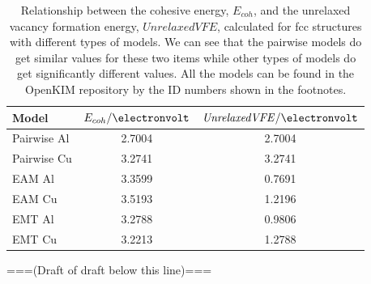 \documentclass[%
 reprint,
 amsmath,amssymb,
 aps,
]{revtex4-1}
\begin{document}
\begin{table}[!b]
\caption{\label{tab:cohvfe}
 Relationship between the cohesive energy, $E_{coh}$, and the unrelaxed vacancy formation energy, $\mathit{UnrelaxedVFE}$, calculated for fcc structures with different types of models.
 We can see that the pairwise models do get similar values for these two items while other types of models do get significantly different values.
 All the models can be found in the OpenKIM repository by the ID numbers shown in the footnotes.
}
\begin{ruledtabular}
\begin{tabular}{l c c}
 Model & $E_{coh}/\electronvolt$ & $\mathit{UnrelaxedVFE}/\electronvolt$\\
\hline
Pairwise Al\footnotemark[1] & 2.7004 & 2.7004\\
Pairwise Cu\footnotemark[1] & 3.2741 & 3.2741\\
EAM Al\footnotemark[2] & 3.3599 & 0.7691\\
EAM Cu\footnotemark[3] & 3.5193 & 1.2196\\
EMT Al\footnotemark[4] & 3.2788 & 0.9806\\
EMT Cu\footnotemark[4] & 3.2213 & 1.2788\\
\end{tabular}
\end{ruledtabular}
\end{table}

===(Draft of draft below this line)===
\end{document}
